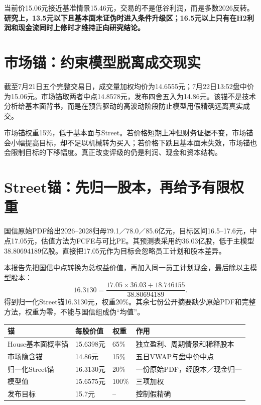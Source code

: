 \begin{keyinsight}
当前价15.06元接近基准情景15.46元，交易的不是低谷利润，而是多数2026反转。\textbf{研究上，13.5元以下且基本面未证伪时进入条件升级区；16.5元以上只有在H2利润和现金流同时上修时才维持正向研究结论。}
\end{keyinsight}

\section{市场锚：约束模型脱离成交现实}

截至7月21日五个完整交易日，成交量加权均价为14.6555元；7月22日13:52盘中价为15.06元。市场锚取两者中点14.8578元，发布四舍五入为14.86元。该锚不是技术分析给基本面背书，而是在预告驱动的高波动阶段防止模型用假精确远离真实成交。

市场锚权重15\%，低于基本面与Street。若价格短期上冲但财务证据不变，市场锚会小幅提高目标，却不足以机械转为买入；若价格下跌且基本面未失效，市场锚也会限制目标的下移幅度。真正改变评级的仍是利润、现金和资本结构。

\section{Street锚：先归一股本，再给予有限权重}

国信原始PDF给出2026--2028归母79.1／78.0／85.6亿元，目标区间16.5--17.6元，中点17.05元，估值方法为FCFE与可比PE。其预测表采用约36.03亿股，低于主模型38.80694189亿股。直接把17.05元作为目标会忽略员工计划和股本差异。

本报告先把国信中点转换为总权益价值，再加入同一员工计划现金，最后除以主模型股本：
\[
16.3130=\frac{17.05\times36.03+18.746155}{38.80694189}.
\]
得到归一化Street锚16.3130元，权重20\%。其余七份公开摘要缺少原始PDF和完整方法，权重为零，不能与国信组成伪“均值”。

\begin{exhibitbox}[多锚目标价桥]
\noindent\begin{tabularx}{\textwidth}{L{3.35cm}R{2.0cm}R{1.7cm}X}
\toprule
\textbf{锚} & \textbf{每股价值} & \textbf{权重} & \textbf{作用} \\
\midrule
House基本面概率锚 & 15.6398元 & 65\% & 独立盈利、周期情景和稀释股本 \\
市场隐含锚 & 14.86元 & 15\% & 五日VWAP与盘中价中点 \\
归一化Street锚 & 16.3130元 & 20\% & 一份原始PDF，经股本／现金归一 \\
模型值 & 15.6575元 & 100\% & 三项加权 \\
发布目标 & 15.7元 & -- & 控制假精确 \\
\bottomrule
\end{tabularx}
\end{exhibitbox}

